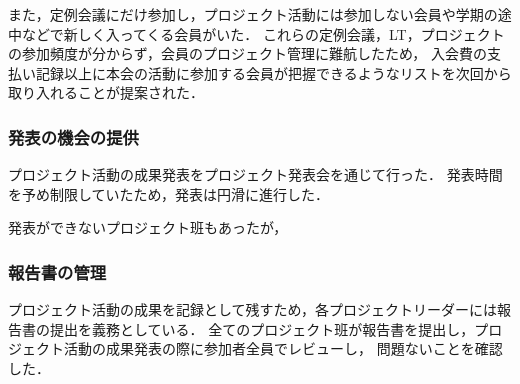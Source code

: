 また，定例会議にだけ参加し，プロジェクト活動には参加しない会員や学期の途中などで新しく入ってくる会員がいた．
これらの定例会議，LT，プロジェクトの参加頻度が分からず，会員のプロジェクト管理に難航したため，
入会費の支払い記録以上に本会の活動に参加する会員が把握できるようなリストを次回から取り入れることが提案された．

\subsubsection*{発表の機会の提供}

プロジェクト活動の成果発表をプロジェクト発表会を通じて行った．
発表時間を予め制限していたため，発表は円滑に進行した．

発表ができないプロジェクト班もあったが，

\subsubsection*{報告書の管理}

プロジェクト活動の成果を記録として残すため，各プロジェクトリーダーには報告書の提出を義務としている．
全てのプロジェクト班が報告書を提出し，プロジェクト活動の成果発表の際に参加者全員でレビューし，
問題ないことを確認した．
